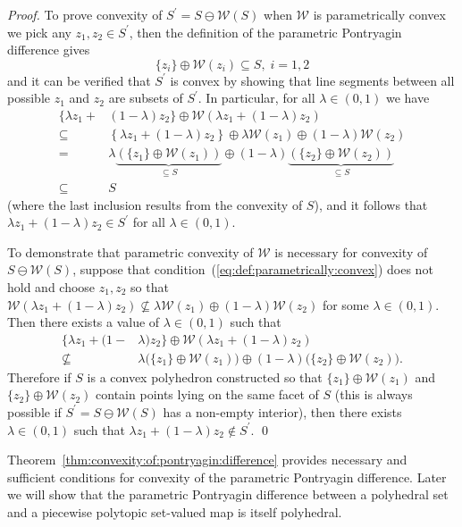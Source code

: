 \documentclass[smallextended]{svjour3}       %
\numberwithin{equation}{section}
\begin{document}
\begin{proof}
To prove convexity of $S^\prime =  S\ominus \mathcal W( S)$ when $\mathcal W$ is parametrically convex we pick any $z_1,z_2\in S^\prime$, then
the definition of the parametric Pontryagin difference gives
\begin{equation}
  \{z_i\} \oplus \mathcal W(z_i) \subseteq S,\; i=1,2 
\end{equation}
%
and it can be verified that $S^\prime$ is convex by showing that line segments between all possible $z_1$ and $z_2$ are subsets of $S^\prime$. In particular, for all $\lambda \in (0,1)$ we have
\begin{align*}
  \{ \lambda z_1 + &(1-\lambda)z_2
  \}\oplus \mathcal W\left( \lambda z_1 + (1-\lambda)z_2\right)\\
  \subseteq&\left\{ \lambda z_1 + (1-\lambda)z_2
  \right\}\oplus \lambda \mathcal W(z_1) \oplus (1-\lambda)
  \mathcal W(z_2)\\
 = &\lambda\underbrace{(\{z_1\}\oplus \mathcal W(z_1))}_{\subseteq S}\oplus
  (1-\lambda)\underbrace{(\{z_2\}\oplus \mathcal W(z_2))}_{\subseteq S}\\
  \subseteq& S
\end{align*}
%
(where the last inclusion results from the convexity of $S$), and it follows that
$\lambda z_1 + (1-\lambda) z_2 \in S^\prime$ for all $\lambda \in (0,1)$. 
%

To demonstrate that parametric convexity of $\mathcal W$ is necessary for convexity of $S\ominus \mathcal W(S)$, suppose that condition~(\ref{eq:def:parametrically:convex}) does not hold and choose $z_1,z_2$ so that $\mathcal W(\lambda z_1 + (1-\lambda) z_2) \not\subseteq \lambda \mathcal W(z_1) \oplus (1-\lambda) \mathcal W (z_2)$ for some $\lambda \in (0,1)$. Then there exists a value of $\lambda\in(0,1)$ such that
\begin{align*}
  \{ \lambda z_1 + (1-&\lambda)z_2
  \}\oplus \mathcal W\left( \lambda z_1 + (1-\lambda)z_2\right)\\
 \not\subseteq &\lambda\bigl(\{z_1\}\oplus \mathcal W(z_1)\bigr)\oplus
  (1-\lambda)\bigl(\{z_2\}\oplus \mathcal W(z_2)\bigr) .
\end{align*}
Therefore if $S$ is a convex polyhedron constructed so that $\{z_1\}\oplus\mathcal W(z_1)$ and $\{z_2\}\oplus\mathcal W(z_2)$ contain points lying on the same facet of $S$ (this is always possible if $S^\prime=S\ominus \mathcal W(S)$ has a non-empty interior), then there exists $\lambda \in (0,1)$ such that $\lambda z_1 + (1-\lambda) z_2 \notin S^\prime$.
\qed
\end{proof}
%
Theorem~\ref{thm:convexity:of:pontryagin:difference} provides necessary and sufficient conditions for convexity of the parametric Pontryagin difference. 
%
Later we will show that the parametric Pontryagin difference between a polyhedral set and a piecewise polytopic set-valued map is itself polyhedral.
%
%
%
%
\end{document}
